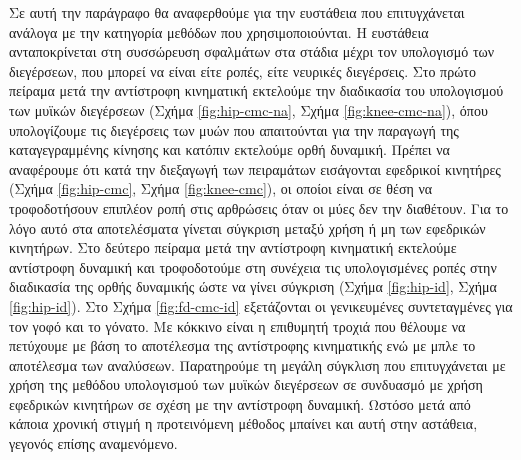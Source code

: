 Σε αυτή την παράγραφο θα αναφερθούμε για την ευστάθεια που επιτυγχάνεται ανάλογα με την κατηγορία μεθόδων που χρησιμοποιούνται. Η ευστάθεια ανταποκρίνεται στη συσσώρευση σφαλμάτων στα στάδια μέχρι τον υπολογισμό των διεγέρσεων, που μπορεί να είναι είτε ροπές, είτε νευρικές διεγέρσεις. Στο πρώτο πείραμα μετά την αντίστροφη κινηματική εκτελούμε την διαδικασία του υπολογισμού των μυϊκών διεγέρσεων (Σχήμα \ref{fig:hip-cmc-na}, Σχήμα \ref{fig:knee-cmc-na}), όπου υπολογίζουμε τις διεγέρσεις των μυών που απαιτούνται για την παραγωγή της καταγεγραμμένης κίνησης και κατόπιν εκτελούμε ορθή δυναμική. Πρέπει να αναφέρουμε ότι κατά την διεξαγωγή των πειραμάτων εισάγονται εφεδρικοί κινητήρες (Σχήμα \ref{fig:hip-cmc}, Σχήμα \ref{fig:knee-cmc}), οι οποίοι είναι σε θέση να τροφοδοτήσουν επιπλέον ροπή στις αρθρώσεις όταν οι μύες δεν την διαθέτουν. Για το λόγο αυτό στα αποτελέσματα γίνεται σύγκριση μεταξύ χρήση ή μη των εφεδρικών κινητήρων. Στο δεύτερο πείραμα μετά την αντίστροφη κινηματική εκτελούμε αντίστροφη δυναμική και τροφοδοτούμε στη συνέχεια τις υπολογισμένες ροπές στην διαδικασία της ορθής δυναμικής ώστε να γίνει σύγκριση (Σχήμα \ref{fig:hip-id}, Σχήμα \ref{fig:hip-id}). Στο Σχήμα \ref{fig:fd-cmc-id} εξετάζονται οι γενικευμένες συντεταγμένες για τον γοφό και το γόνατο. Με κόκκινο είναι η επιθυμητή τροχιά που θέλουμε να πετύχουμε με βάση το αποτέλεσμα της αντίστροφης κινηματικής ενώ με μπλε το αποτέλεσμα των αναλύσεων. Παρατηρούμε τη μεγάλη σύγκλιση που επιτυγχάνεται με χρήση της μεθόδου υπολογισμού των μυϊκών διεγέρσεων σε συνδυασμό με χρήση εφεδρικών κινητήρων σε σχέση με την αντίστροφη δυναμική. Ωστόσο μετά από κάποια χρονική στιγμή η προτεινόμενη μέθοδος μπαίνει και αυτή στην αστάθεια, γεγονός επίσης αναμενόμενο.


